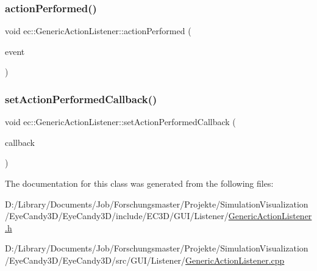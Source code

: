 \subsubsection{\texorpdfstring{action\+Performed()}{actionPerformed()}}
{\footnotesize\ttfamily void ec\+::\+Generic\+Action\+Listener\+::action\+Performed (\begin{DoxyParamCaption}\item[{const agui\+::\+Action\+Event \&}]{event }\end{DoxyParamCaption})\hspace{0.3cm}{\ttfamily [override]}}

\mbox{\label{classec_1_1_generic_action_listener_ae824ead75dce8eae0910da7432e3c400}} 
\subsubsection{\texorpdfstring{set\+Action\+Performed\+Callback()}{setActionPerformedCallback()}}
{\footnotesize\ttfamily void ec\+::\+Generic\+Action\+Listener\+::set\+Action\+Performed\+Callback (\begin{DoxyParamCaption}\item[{const \mbox{\hyperlink{classec_1_1_generic_action_listener_ab58c5e9b4caf14e4d1b1e50ffff5e628}{Action\+Performed\+\_\+\+Callback}} \&}]{callback }\end{DoxyParamCaption})}



The documentation for this class was generated from the following files\+:\begin{DoxyCompactItemize}
\item 
D\+:/\+Library/\+Documents/\+Job/\+Forschungsmaster/\+Projekte/\+Simulation\+Visualization/\+Eye\+Candy3\+D/\+Eye\+Candy3\+D/include/\+E\+C3\+D/\+G\+U\+I/\+Listener/\mbox{\hyperlink{_generic_action_listener_8h}{Generic\+Action\+Listener.\+h}}\item 
D\+:/\+Library/\+Documents/\+Job/\+Forschungsmaster/\+Projekte/\+Simulation\+Visualization/\+Eye\+Candy3\+D/\+Eye\+Candy3\+D/src/\+G\+U\+I/\+Listener/\mbox{\hyperlink{_generic_action_listener_8cpp}{Generic\+Action\+Listener.\+cpp}}\end{DoxyCompactItemize}
